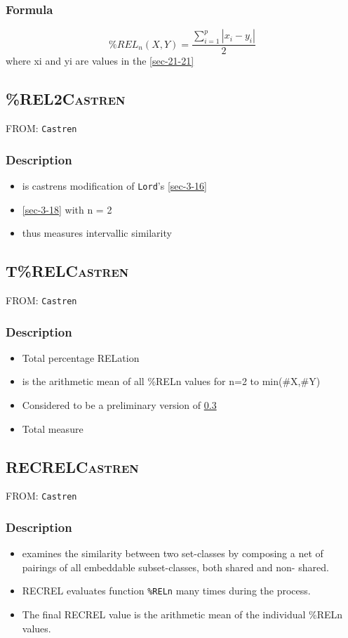\documentclass[11pt]{article}
\begin{document}
\subsubsection{Formula}
\label{sec-3-18-2}
$$ \%REL_n(X,Y)=\frac{\sum_{i=1}^{p}|x_i-y_i|}{2} $$
where xi and yi are values in the \ref{sec-21-21}

\subsection{\%REL2\hfill{}\textsc{Castren}}
\label{sec-3-19}
FROM: \texttt{Castren}
\subsubsection{Description}
\label{sec-3-19-1}
\begin{itemize}
\item is castrens modification of \texttt{Lord}'s \ref{sec-3-16}
\item \ref{sec-3-18} with n = 2
\item thus measures intervallic similarity
\end{itemize}

\subsection{T\%REL\hfill{}\textsc{Castren}}
\label{sec-3-20}
FROM: \texttt{Castren}
\subsubsection{Description}
\label{sec-3-20-1}
\begin{itemize}
\item Total percentage RELation
\item is the arithmetic mean of all \%RELn values for n=2 to min(\#X,\#Y)
\item Considered to be a preliminary version of \ref{sec-3-21}
\item Total measure
\end{itemize}

\subsection{RECREL\hfill{}\textsc{Castren}}
\label{sec-3-21}
FROM: \texttt{Castren}
\subsubsection{Description}
\label{sec-3-21-1}
\begin{itemize}
\item examines the similarity between two set-classes by composing a
net of pairings of all embeddable subset-classes, both shared
and non- shared.
\item RECREL evaluates function \texttt{\%RELn} many times during the process.
\item The final RECREL value is the arithmetic mean of the individual
\%RELn values.
\end{itemize}
\end{document}
